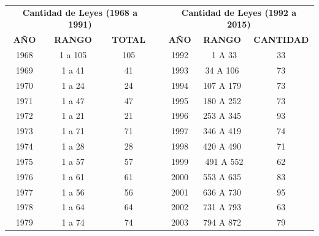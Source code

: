 \documentclass[conference]{IEEEtran}\usepackage[]{graphicx}\usepackage[]{color}
\begin{document}
\begin{table}[h]
	\centering		
	\begin{tabular}{|c|c|c|r|c|c|c|}
		
		\multicolumn{ 3}{|c|}{{\bf Cantidad de Leyes (1968 a 1991)}} &            & \multicolumn{ 3}{|c|}{{\bf Cantidad de Leyes (1992 a 2015)}} \\
		
		{\bf AÑO} & {\bf RANGO} & {\bf TOTAL} &            &  {\bf AÑO} & {\bf RANGO} & {\bf CANTIDAD} \\
		
		1968 &    1 a 105 &        105 &            &       1992 &     1 A 33 &         33 \\
		
		1969 &     1 a 41 &         41 &            &       1993 &   34 A 106 &         73 \\
		
		1970 &     1 a 24 &         24 &            &       1994 &  107 A 179 &         73 \\
		
		1971 &     1 a 47 &         47 &            &       1995 &  180 A 252 &         73 \\
		
		1972 &     1 a 21 &         21 &            &       1996 &  253 A 345 &         93 \\
		
		1973 &     1 a 71 &         71 &            &       1997 &  346 A 419 &         74 \\
		
		1974 &     1 a 28 &         28 &            &       1998 &  420 A 490 &         71 \\
		
		1975 &     1 a 57 &         57 &            &       1999 &  491 A 552 &         62 \\
		
		1976 &     1 a 61 &         61 &            &       2000 &  553 A 635 &         83 \\
		
		1977 &     1 a 56 &         56 &            &       2001 &  636 A 730 &         95 \\
		
		1978 &     1 a 64 &         64 &            &       2002 &  731 A 793 &         63 \\
		
		1979 &     1 a 74 &         74 &            &       2003 &  794 A 872 &         79 \\
		

\end{tabular}
\end{table}
\end{document}
